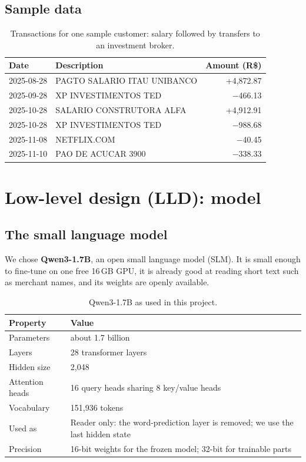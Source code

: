 \documentclass[10pt,a4paper]{article}
\begin{document}
\subsection{Sample data}
\begin{table}[!htb]
\centering\footnotesize
\begin{tabular}{@{}llr@{}}
\toprule
\textbf{Date} & \textbf{Description} & \textbf{Amount (R\$)} \\
\midrule
2025-08-28 & PAGTO SALARIO ITAU UNIBANCO & +4,872.87 \\
2025-09-28 & XP INVESTIMENTOS TED & $-$466.13 \\
2025-10-28 & SALARIO CONSTRUTORA ALFA & +4,912.91 \\
2025-10-28 & XP INVESTIMENTOS TED & $-$988.68 \\
2025-11-08 & NETFLIX.COM & $-$40.45 \\
2025-11-10 & PAO DE ACUCAR 3900 & $-$338.33 \\
\bottomrule
\end{tabular}
\caption{Transactions for one sample customer: salary followed by transfers to an investment broker.}
\end{table}

\section{Low-level design (LLD): model}
\subsection{The small language model}
We chose \textbf{Qwen3-1.7B}, an open small language model (SLM). It is small enough to fine-tune on one free 16\,GB GPU, it is already good at reading short text such as merchant names, and its weights are openly available.

\begin{table}[!htb]
\centering\footnotesize
\begin{tabular}{@{}ll@{}}
\toprule
\textbf{Property} & \textbf{Value} \\
\midrule
Parameters & about 1.7 billion \\
Layers & 28 transformer layers \\
Hidden size & 2,048 \\
Attention heads & 16 query heads sharing 8 key/value heads \\
Vocabulary & 151,936 tokens \\
Used as & Reader only: the word-prediction layer is removed; we use the last hidden state \\
Precision & 16-bit weights for the frozen model; 32-bit for trainable parts \\
\bottomrule
\end{tabular}
\caption{Qwen3-1.7B as used in this project.}
\end{table}
\end{document}

